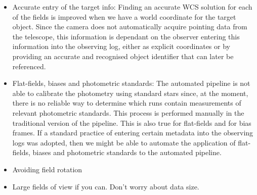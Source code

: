 \begin{itemize}
	\item Accurate entry of the target info: Finding an accurate WCS solution for each of the fields is improved when we have a world coordinate for the target object. Since the camera does not automatically acquire pointing data from the telescope, this information is dependant on the observer entering this information into the observing log, either as explicit coordinates or by providing an accurate and recognised object identifier that can later be referenced. 
	\item Flat-fields, biases and photometric standards: The automated pipeline is not able to calibrate the photometry using standard stars since, at the moment, there is no reliable way to determine which runs contain measurements of relevant photometric standards. This process is performed manually in the traditional version of the pipeline. This is also true for flat-fields and for bias frames. If a standard practice of entering certain metadata into the observing logs was adopted, then we might be able to automate the application of flat-fields, biases and photometric standards to the automated pipeline. 
	\item Avoiding field rotation
	\item Large fields of view if you can. Don't worry about data size. 
\end{itemize} 



